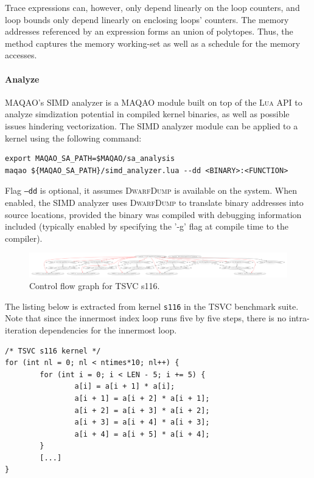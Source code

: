 \documentclass[11pt, a4paper, twoside]{montblanc2}
\def\lua{\textsc{Lua}\xspace}
\def\dd{\textsc{DwarfDump}\xspace}
\begin{document}
Trace expressions can, however, only depend linearly on the loop counters, and
loop bounds only depend linearly on enclosing loops' counters. The memory
addresses referenced by an expression forms an union of polytopes. Thus, the
method captures the memory working-set as well as a schedule for the memory
accesses.

\paragraph{Analyze}

MAQAO's SIMD analyzer is a MAQAO module built on top of the \lua API to analyze
simdization potential in compiled kernel binaries, as well as possible issues
hindering vectorization. The SIMD analyzer module can be applied to a kernel
using the following command:

\begin{verbatim}
export MAQAO_SA_PATH=$MAQAO/sa_analysis
maqao ${MAQAO_SA_PATH}/simd_analyzer.lua --dd <BINARY>:<FUNCTION>
\end{verbatim}

Flag \texttt{--dd} is optional, it assumes \dd is available on the system. When
enabled, the SIMD analyzer uses \dd to translate binary addresses into source
locations, provided the binary was compiled with debugging information included
(typically enabled by specifying the '-g' flag at compile time to the compiler).

\begin{figure}[h]
  \centering
\includegraphics[width=1\textwidth]{fs116_l47}
\caption{Control flow graph for TSVC s116.}\label{fig:cfgs116}
\end{figure}

The listing below is extracted from kernel \texttt{s116} in the TSVC benchmark
suite. Note that since the innermost index loop runs five by five steps, there is no
intra-iteration dependencies for the innermost loop.
\lstset{style=C}
\begin{lstlisting}
/* TSVC s116 kernel */
for (int nl = 0; nl < ntimes*10; nl++) {
        for (int i = 0; i < LEN - 5; i += 5) {
                a[i] = a[i + 1] * a[i];
                a[i + 1] = a[i + 2] * a[i + 1];
                a[i + 2] = a[i + 3] * a[i + 2];
                a[i + 3] = a[i + 4] * a[i + 3];
                a[i + 4] = a[i + 5] * a[i + 4];
        }
        [...]
}
\end{lstlisting}
\end{document}
